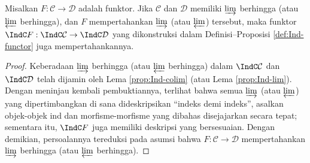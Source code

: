 \begin{lemma}\label{prop:Ind-hat-functor-prep}
	Misalkan $F: \mathcal{C} \to \mathcal{D}$ adalah funktor. Jika $\mathcal{C}$ dan $\mathcal{D}$ memiliki $\varinjlim$ berhingga (atau $\varprojlim$ berhingga), dan $F$ mempertahankan $\varinjlim$ (atau $\varprojlim$) tersebut, maka funktor $\IndC F: \IndC\mathcal{C} \to \IndC\mathcal{D}$ yang dikonstruksi dalam Definisi--Proposisi \ref{def:Ind-functor} juga mempertahankannya.
\end{lemma}
\begin{proof}
	Keberadaan $\varinjlim$ berhingga (atau $\varprojlim$ berhingga) dalam $\IndC\mathcal{C}$ dan $\IndC\mathcal{D}$ telah dijamin oleh Lema \ref{prop:Ind-colim} (atau Lema \ref{prop:Ind-lim}). Dengan meninjau kembali pembuktiannya, terlihat bahwa semua $\varinjlim$ (atau $\varprojlim$) yang dipertimbangkan di sana dideskripsikan ``indeks demi indeks'', asalkan objek-objek ind dan morfisme-morfisme yang dibahas disejajarkan secara tepat; sementara itu, $\IndC F$ juga memiliki deskripsi yang bersesuaian. Dengan demikian, persoalannya tereduksi pada asumsi bahwa $F: \mathcal{C} \to \mathcal{D}$ mempertahankan $\varinjlim$ berhingga (atau $\varprojlim$ berhingga).
\end{proof}

